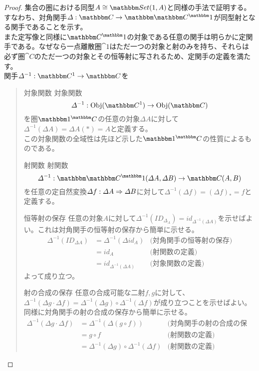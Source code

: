   \begin{proof}
    集合の圏における同型$A\cong\arset{Set}{1}{A}$と同様の手法で証明する。
    すなわち、対角関手$\functor{\varDelta}{C}{\funccat{1}{C}}$が同型射となる関手であることを示す。\\
    また定写像と同様に$\funccat{1}{C}$の対象である任意の関手は明らかに定関手である。なぜなら一点離散圏$\cat{1}$はただ一つの対象と射のみを持ち、それらは必ず圏$\cat{C}$のただ一つの対象とその恒等射に写されるため、定関手の定義を満たす。\\
    関手$\functor{\varDelta^{-1}}{C^1}{C}$を
    \begin{quote}
			\begin{mydescription}
				\item[対象関数]対象関数\[\mor{\varDelta^{-1}}{\obj{C^1}}{\obj{C}}\]を圏$\funccat{C}{1}$の任意の対象$\varDelta A$に対して$\varDelta^{-1}(\varDelta A)=\varDelta A(*)=A$と定義する。\\
        この対象関数の全域性は先ほど示した$\funccat{C}{1}$の性質によるものである。
				\item[射関数]射関数\[\mor{\varDelta^{-1}}{\arset{\funccat{1}{C}}{\varDelta A}{\varDelta B}}{\arset{C}{A}{B}}\]を任意の定自然変換$\varDelta f:\varDelta A\Rightarrow \varDelta B$に対して$\varDelta^{-1}(\varDelta f) = (\varDelta f)_*=f$と定義する。
				\item[恒等射の保存]任意の対象$A$に対して$\varDelta^{-1}(ID_{\varDelta_A})=id_{\varDelta^{-1}(\varDelta A)}$を示せばよい。これは対角関手の恒等射の保存から簡単に示せる。
				\begin{align*}
          \varDelta^{-1}(ID_{\varDelta A})&=\varDelta^{-1}(\varDelta id_A)&\text{(対角関手の恒等射の保存)}\\
          &=id_A&\text{(射関数の定義)}\\
          &=id_{\varDelta^{-1}(\varDelta A)}&\text{(対象関数の定義)}
        \end{align*}
        よって成り立つ。
				\item[射の合成の保存]任意の合成可能な二射$f,g$に対して、$\varDelta^{-1}(\varDelta g\cdot\varDelta f)=\varDelta^{-1}(\varDelta g)\circ\varDelta^{-1}(\varDelta f)$が成り立つことを示せばよい。同様に対角関手の射の合成の保存から簡単に示せる。
				\begin{align*}
          \varDelta^{-1}(\varDelta g\cdot\varDelta f)&=\varDelta^{-1}(\varDelta(g\circ f))&\text{(対角関手の射の合成の保存)}\\
          &=g\circ f&\text{(射関数の定義)}\\
          &=\varDelta^{-1}(\varDelta g)\circ\varDelta^{-1}(\varDelta f)&\text{(射関数の定義)}

\end{align*}
\end{mydescription}
\end{quote}
\end{proof}
